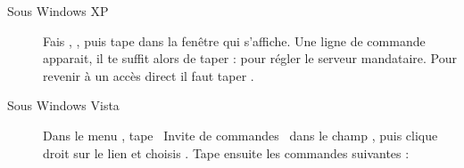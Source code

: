 \begin{description}

\item[Sous Windows XP] Fais , , puis
tape  dans la fenêtre qui s'affiche. Une ligne de commande apparait,
il te suffit alors de taper :  pour régler
le serveur mandataire. Pour revenir à un accès direct il faut taper .

\item[Sous Windows Vista]
Dans le menu , tape \guillemotleft~Invite de commandes~\guillemotright{} dans le champ , puis clique droit sur le lien
et choisis . Tape ensuite les commandes suivantes :



\end{description}
